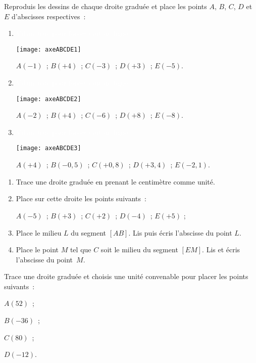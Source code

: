 \begin{exercice}
Reproduis les dessins de chaque droite graduée et place les points $A$, $B$, $C$, $D$ et $E$ d'abscisses respectives :

\begin{enumerate}
  \item \textcolor{white}{Vilain truc pour forcer saut de ligne}

	\begin{center} \texttt{[image: axeABCDE1]} \end{center}
  
 $A(-1)$ ; $B(+4)$ ; $C(-3)$ ; $D(+3)$ ; $E(-5)$. \\[1em]
  \item \textcolor{white}{Vilain truc pour forcer saut de ligne}

	\begin{center} \texttt{[image: axeABCDE2]} \end{center}
  
 $A(-2)$ ; $B(+4)$ ; $C(-6)$ ; $D(+8)$ ; $E(-8)$. \\[2em]
  \item \textcolor{white}{Vilain truc pour forcer saut de ligne}

	\begin{center} \texttt{[image: axeABCDE3]} \end{center}
  
 $A(+4)$ ; $B(-0,5)$ ; $C(+0,8)$ ; $D(+3,4)$ ; $E(-2,1)$.
 \end{enumerate}
\end{exercice}


\begin{exercice}
\begin{enumerate}
 \item Trace une droite graduée en prenant le centimètre comme unité.
 \item Place sur cette droite les points suivants : 
 
$A(-5)$ ; $B(+3)$ ; $C(+2)$ ; $D(-4)$ ; $E(+5)$ ;
 \item Place le milieu $L$ du segment $[AB]$. Lis puis écris l'abscisse du point $L$.
 \item Place le point $M$ tel que $C$ soit le milieu du segment $[EM]$. Lis et écris l'abscisse du point $M$.
 \end{enumerate}
\end{exercice}


\begin{exercice}
Trace une droite graduée et choisis une unité convenable pour placer les points suivants :
\begin{colitemize}{4}
 \item $A(52)$ ;
 \item $B(-36)$ ;
 \item $C(80)$ ;
 \item $D(-12)$.
 \end{colitemize}
\end{exercice}


